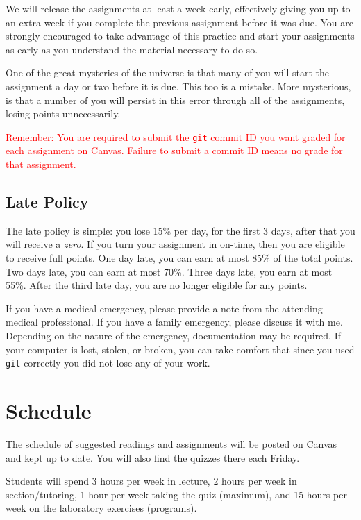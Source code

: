 \documentclass[11pt]{article}
\begin{document}
We will release the assignments at least a week early, effectively giving you up
to an extra week if you complete the previous assignment before it was due. You
are strongly encouraged to take advantage of this practice and start your
assignments as early as you understand the material necessary to do so.

One of the great mysteries of the universe is that many of you
will start the assignment a day or two before it is due. This too is a mistake.
More mysterious, is that a number of you will persist in this error through all
of the assignments, losing points unnecessarily.

\textcolor{red}{Remember: You are required to submit the \texttt{git} commit ID
you want graded for each assignment on Canvas. Failure to submit a commit ID
means no grade for that assignment.}

\subsection{Late Policy}

The late policy is simple: you lose 15\% per day, for the first 3 days, after
that you will receive a \emph{zero}. If you turn your assignment in on-time,
then you are eligible to receive full points. One day late, you can earn at most
85\% of the total points. Two days late, you can earn at most 70\%. Three days
late, you earn at most 55\%. After the third late day, you are no longer
eligible for any points.

\begin{center}
  
\end{center}

If you have a medical emergency, please provide a note from the attending
medical professional. If you have a family emergency, please discuss it with me.
Depending on the nature of the emergency, documentation may be required. If your
computer is lost, stolen, or broken, you can take comfort that since you used
\texttt{git} correctly you did not lose any of your work.

\section{Schedule}

The schedule of suggested readings and assignments will be posted on Canvas and
kept up to date. You will also find the quizzes there each Friday.

Students will spend 3 hours per week in lecture, 2 hours per week
in section/tutoring, 1 hour per week taking the quiz (maximum), and
15 hours per week on the laboratory exercises (programs).
\end{document}
